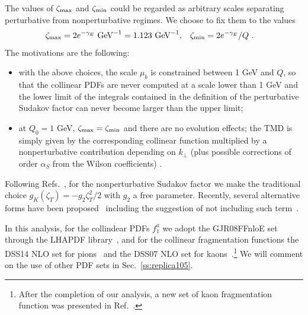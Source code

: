\documentclass[aps,preprintnumbers,showpacs,nofootinbib,superscriptaddress,floatfix]{revtex4}
\newcommand{\T}{\perp}
\newcommand{\bT}{\zeta_T}
\newcommand{\bb}{\zeta}
\begin{document}
The values of $\bb_{\rm max}$ and
$\bb_{\rm min}$ could
be regarded as arbitrary scales separating perturbative from nonperturbative
regimes. 
We choose to fix them to the
values 
\begin{align}
\bb_{\rm max} &= 2 e^{-\gamma_E}  \text{  GeV}^{-1} = 1.123 \text{  GeV}^{-1}, 
&
\bb_{\rm min} &= 2 e^{-\gamma_E}/Q \ .
\label{e:bminmax}
\end{align} 
The motivations are the following: 
\begin{itemize}
\item{} with the above choices, the scale $\mu_b$ is
  constrained between 1 GeV and $Q$, so that the collinear PDFs are never
  computed at a scale lower than 1 GeV and the lower limit of the integrals
  contained in the definition of the perturbative Sudakov factor can never
  become larger than the upper limit;
\item{} at $Q_0 = 1$ GeV, $\bb_{\rm max} = \bb_{\rm min}$ and there are no evolution effects; the TMD is
simply given by the corresponding collinear function multiplied by a
nonperturbative contribution depending on $k_\T$ (plus possible corrections of
order $\alpha_S$ from the Wilson coefficients) .
\end{itemize} 

Following Refs.~\cite{Nadolsky:1999kb,Landry:2002ix,Konychev:2005iy}, for the
nonperturbative Sudakov factor we make the traditional choice $g_K (\bT) = -
g_2 \bT^2 / 2$ with $g_2$ a free parameter. Recently, several alternative
forms have been proposed~\cite{Aidala:2014hva,Collins:2014jpa} including the
suggestion of not including such term~\cite{D'Alesio:2014vja}. 

In this analysis, for the collindear PDFs $f_1^a$ we adopt the GJR08FFnloE
set~\cite{Gluck:2007ck} through the LHAPDF library~\cite{Buckley:2014ana}, and
for the collinear fragmentation functions 
the DSS14 NLO set for
pions~\cite{deFlorian:2014xna} and the DSS07 NLO set for
kaons~\cite{deFlorian:2007aj}.\footnote{After the completion of our analysis, 
a new set of kaon
  fragmentation function was presented in Ref.~\cite{deFlorian:2017lwf}.} We
will comment on the use of other PDF sets in Sec.~\ref{ss:replica105}.
\end{document}
